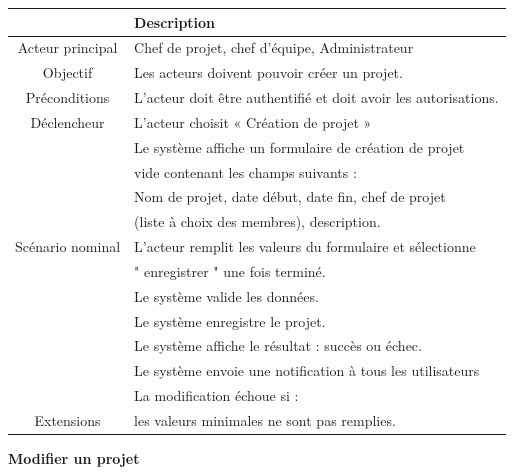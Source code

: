 \begin{center}
\begin{tabular}{|c|l|}
\hline 
&\textbf { Description }\\\hline 
    Acteur principal & Chef de projet, chef d’équipe, Administrateur \\\hline 
    Objectif&Les acteurs doivent pouvoir créer un projet.\\\hline
    Préconditions&L’acteur doit être authentifié et doit avoir les autorisations.  \\\hline 
    Déclencheur&L’acteur choisit « Création de projet »\\\hline 
    &Le système affiche un formulaire de création de projet    \\&vide contenant les champs suivants :  \\
    &Nom de projet, date début, date fin, chef de projet   \\
    &(liste à choix des membres), description.\\
    Scénario nominal&L’acteur remplit les valeurs du formulaire et sélectionne   \\
    & " enregistrer " une fois terminé. \\
    &Le système valide les données. \\
    &Le système enregistre le projet.   \\
    &Le système affiche le résultat : succès ou échec. \\
    &Le système envoie une notification à tous les utilisateurs\\\hline
    &La modification échoue si :  \\
    Extensions&les valeurs minimales ne sont pas remplies.\\\hline
\end{tabular}
\label{desc_cree_proj}
\end{center}
\newpage
\par \textbf{ 	 	Modifier un projet}


